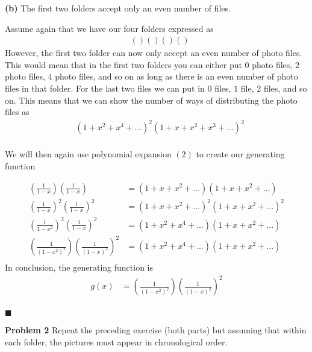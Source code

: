 \documentclass[12pt]{article}
\renewcommand{\qed}{\hfill$\blacksquare$}
\begin{document}
\noindent\textbf{(b)} The first two folders accept only an even number of files.\\
\begin{addmargin}[1em]{1em}
    
    Assume again that we have our four folders expressed as
    \begin{align*}
        &()()()()
    \end{align*}
    However, the first two folder can now only accept an even number of photo files. This would mean that in the first two folders you can either put $0$ photo files, $2$ photo files, $4$ photo files, and so on as long as there is an even number of photo files in that folder. For the last two files we can put in $0$ files, $1$ file, $2$ files, and so on. This means that we can show the number of ways of distributing the photo files as
    \begin{align*}
        &(1 + x^2 + x^4 + ...)^2(1+x+x^2+x^3+...)^2\\
    \end{align*}

    We will then again use polynomial expansion $(2)$ to create our generating function

    \begin{align*}
        (\frac{1}{1-x})(\frac{1}{1-x}) &= (1 + x + x^2 + ...)(1 + x + x^2 + ...)\\
        (\frac{1}{1-x})^2(\frac{1}{1-x})^2 &= (1 + x + x^2 + ...)^2(1 + x + x^2 + ...)^2\\
        (\frac{1}{1-x^2})^2(\frac{1}{1-x})^2 &= (1 + x^2 + x^4 + ...)(1 + x + x^2 + ...)\\
        (\frac{1}{(1-x^2)^2})(\frac{1}{(1-x)^2})^2 &= (1 + x^2 + x^4 + ...)(1 + x + x^2 + ...)\\
    \end{align*}
    In conclusion, the generating function is 
    \begin{align*}
        g(x) &= (\frac{1}{(1-x^2)^2})(\frac{1}{(1-x)^2})^2\\
    \end{align*}
    \begin{flushright}
    \qed
    \end{flushright}
\end{addmargin}

\noindent\textbf{Problem 2} Repeat the preceding exercise (both parts) but assuming that within each folder, the pictures must appear in chronological order.\\
\end{document}
